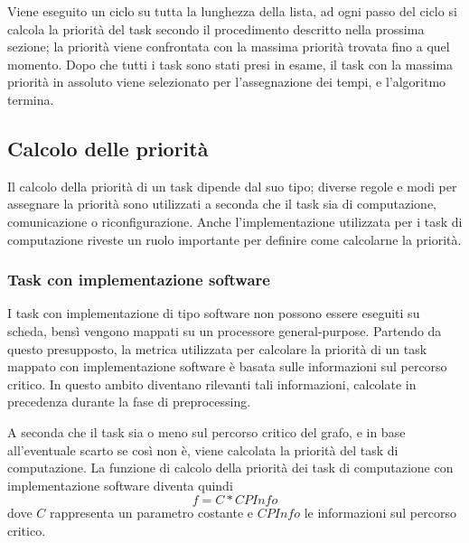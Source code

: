 Viene eseguito un ciclo su tutta la lunghezza della lista, ad ogni passo del 
ciclo si calcola la priorità del task secondo il procedimento descritto nella 
prossima sezione; la priorità viene confrontata con la massima priorità trovata 
fino a quel momento. Dopo che tutti i task sono stati presi in esame, il task 
con la massima priorità in assoluto viene selezionato per l'assegnazione dei 
tempi, e l'algoritmo termina.


\subsection{Calcolo delle priorità}
Il calcolo della priorità di un task dipende dal suo tipo; diverse regole e 
modi per assegnare la priorità sono utilizzati a seconda che il task sia di 
computazione, comunicazione o riconfigurazione. Anche l'implementazione 
utilizzata per i task di computazione riveste un ruolo importante per definire 
come calcolarne la priorità.

\subsubsection{Task con implementazione software}
I task con implementazione di tipo software non possono essere eseguiti su 
scheda, bensì vengono mappati su un processore general-purpose. Partendo da 
questo presupposto, la metrica utilizzata per calcolare la priorità di un task 
mappato con implementazione software è basata sulle informazioni sul percorso 
critico. In questo ambito diventano rilevanti tali informazioni, calcolate 
in precedenza durante la fase di preprocessing.

A seconda che il task sia o meno sul percorso critico del grafo, e in 
base all'eventuale scarto se così non è, viene calcolata la priorità del task 
di computazione. La funzione di calcolo della priorità dei task di computazione 
con implementazione software diventa quindi
\begin{equation} \label{eq:softwarePriority}
 f=C*CPInfo
\end{equation}
dove $C$ rappresenta un parametro costante e $CPInfo$ le informazioni sul 
percorso critico.


